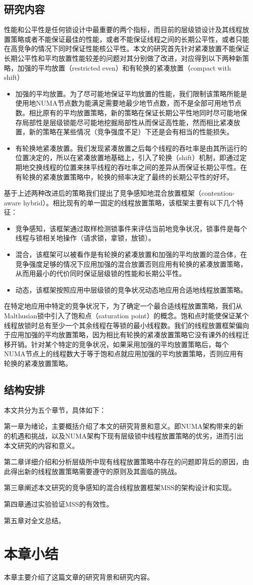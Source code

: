 \subsection{研究内容}
性能和公平性是任何锁设计中最重要的两个指标，而目前的层级锁设计及其线程放置策略或者不能保证最佳的性能，或者不能保证线程之间的长期公平性，或者只能在高竞争的情况下同时保证性能核公平性。本文的研究首先针对紧凑放置不能保证长期公平性和平均放置性能较差的问题对其分别做了改进，对应得到以下两种新策略，加强的平均放置（restricted even）和有轮换的紧凑放置（compact with shift）
\begin{itemize}
\item 加强的平均放置。为了尽可能地保证平均放置的性能，我们限制该策略所能是使用地NUMA节点数为能满足需要地最少地节点数，而不是全部可用地节点数。相比原有的平均放置策略，新的策略在保证长期公平性地同时尽可能地保存局部性是层级锁能尽可能地挖掘局部性从而保证高性能，然而相比紧凑放置，新的策略在某些情况（竞争强度不足）下还是会有相当的性能损失。
\item 有轮换地紧凑放置。我们发现紧凑放置之后每个线程的吞吐率是由其所运行的位置决定的，所以在紧凑放置地基础上，引入了轮换（shift）机制，即通过定期地交换线程的位置来抹平线程的吞吐率之间的差异从而保证长期公平性。在有轮换的紧凑放置策略中，轮换的频率决定了最终的长期公平性的好坏。
\end{itemize}

基于上述两种改进后的策略我们提出了竞争感知地混合放置框架（contention-aware hybrid）。相比现有的单一固定的线程放置策略，该框架主要有以下几个特征：
\begin{itemize}
\item 竞争感知，该框架通过取样检测锁事件来评估当前地竞争状况，锁事件是每个线程与锁相关地操作（请求锁，拿锁，放锁）。
\item 混合，该框架可以被看作是有轮换的紧凑放置和加强的平均放置的混合体，在竞争强度足够的情况下应用加强的混合放置否则应用有轮换的紧凑放置策略，从而用最小的代价同时保证层级锁的性能和长期公平性。
\item 动态，该框架按照应用中层级锁的竞争状况动态地应用合适地线程放置策略。
\end{itemize}

在特定地应用中特定的竞争状况下，为了确定一个最合适线程放置策略，我们从Malthusian锁中引入了饱和点（saturation point）的概念。饱和点时能使保证某个线程放锁时总有至少一个其余线程在等锁的最小线程数。我们的线程放置框架偏向于应用加强的平均放置策略，因为相比有轮换的紧凑放置策略它没有课外的线程迁移开销。针对某个特定的竞争状况，如果采用加强的平均放置策略后，每个NUMA节点上的线程数大于等于饱和点就应用加强的平均放置策略，否则应用有轮换的紧凑放置策略。
\subsection{结构安排}
本文共分为五个章节，具体如下：

第一章为绪论，主要概括介绍了本文的研究背景和意义。即NUMA架构带来的新的机遇和挑战，以及NUMA架构下现有层级锁中线程放置策略的优劣，进而引出本文研究的内容和意义。

第二章详细介绍和分析层级所中现有线程放置策略中存在的问题即背后的原因，由此得出新的线程放置策略需要遵守的原则及其面临的挑战。

第三章阐述本文研究的竞争感知的混合线程放置框架MSS的架构设计和实现。

第四章通过实验验证MSS的有效性。

第五章对全文总结。
\section{本章小结}
本章主要介绍了这篇文章的研究背景和研究内容。